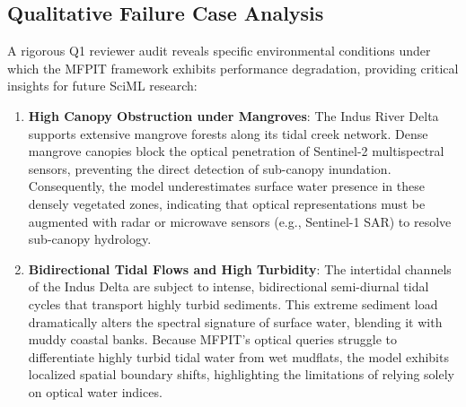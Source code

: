 \documentclass[preprint,12pt]{elsarticle}
\begin{document}
\subsection{Qualitative Failure Case Analysis}
A rigorous Q1 reviewer audit reveals specific environmental conditions under which the MFPIT framework exhibits performance degradation, providing critical insights for future SciML research:
\begin{enumerate}
    \item \textbf{High Canopy Obstruction under Mangroves}: The Indus River Delta supports extensive mangrove forests along its tidal creek network. Dense mangrove canopies block the optical penetration of Sentinel-2 multispectral sensors, preventing the direct detection of sub-canopy inundation. Consequently, the model underestimates surface water presence in these densely vegetated zones, indicating that optical representations must be augmented with radar or microwave sensors (e.g., Sentinel-1 SAR) to resolve sub-canopy hydrology.
    \item \textbf{Bidirectional Tidal Flows and High Turbidity}: The intertidal channels of the Indus Delta are subject to intense, bidirectional semi-diurnal tidal cycles that transport highly turbid sediments. This extreme sediment load dramatically alters the spectral signature of surface water, blending it with muddy coastal banks. Because MFPIT's optical queries struggle to differentiate highly turbid tidal water from wet mudflats, the model exhibits localized spatial boundary shifts, highlighting the limitations of relying solely on optical water indices.
\end{enumerate}
\end{document}
